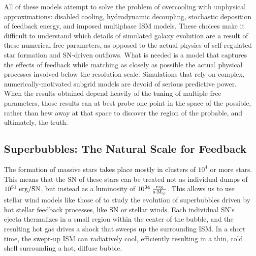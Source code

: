 All of these models attempt to solve the problem of overcooling with unphysical
approximations: disabled cooling, hydrodynamic decoupling, stochastic deposition
of feedback energy, and imposed multiphase ISM models.  These choices make it
difficult to understand which details of simulated galaxy evolution are a result
of these numerical free parameters, as opposed to the actual physics of
self-regulated star formation and SN-driven outflows.  What is needed is a model
that captures the effects of feedback while matching as closely as possible the
actual physical processes involved below the resolution scale.  Simulations that
rely on complex, numerically-motivated subgrid models are devoid of serious
predictive power.  When the results obtained depend heavily of the tuning of
multiple free parameters, those results can at best probe one point in the space
of the possible, rather than hew away at that space to discover the region of
the probable, and ultimately, the truth.  

\subsection{Superbubbles: The Natural Scale for Feedback}
The formation of massive stars takes place mostly in clusters of $10^4$ or more
stars.  This means that the SN of these stars can be treated not as individual
dumps of $10^{51}\;\rm{erg/SN}$, but instead as a luminosity of
$10^{34}\;\rm{\frac{erg}{s \cdot M_\odot}}$.  This allows us to use stellar wind
models like those of \citet{Weaver1977} to study the evolution of superbubbles driven by
hot stellar feedback processes, like SN or stellar winds.  Each individual SN's
ejecta thermalizes in a small region within the center of the bubble, and the
resulting hot gas drives a shock that sweeps up the surrounding ISM.  In a short
time, the swept-up ISM can radiatively cool, efficiently resulting in a thin,
cold shell surrounding a hot, diffuse bubble.


